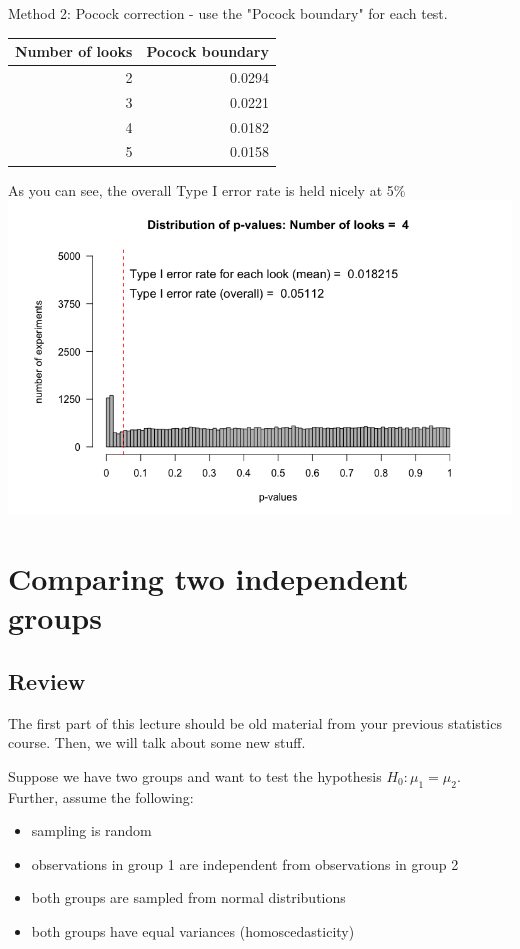 \documentclass[11pt]{article}
\begin{document}
Method 2: Pocock correction - use the "Pocock boundary" for each test.

\begin{center}
\begin{tabular}{rr}
Number of looks & Pocock boundary\\
\hline
2 & 0.0294\\
3 & 0.0221\\
4 & 0.0182\\
5 & 0.0158\\
\end{tabular}
\end{center}

As you can see, the overall Type I error rate is held nicely at 5\%
\includegraphics[width=.9\linewidth]{figures/pocockCorrection.png}

\section*{Comparing two independent groups}
\label{sec-2}
\subsection*{Review}
\label{sec-2-1}
The first part of this lecture should be old material from your previous statistics course.  Then, we will talk about some new stuff.

Suppose we have two groups and want to test the hypothesis $H_0: \mu_1=\mu_2$.  Further, assume the following:
\begin{itemize}
\item sampling is random
\item observations in group 1 are independent from observations in group 2
\item both groups are sampled from normal distributions
\item both groups have equal variances (homoscedasticity)
\end{itemize}
\end{document}
